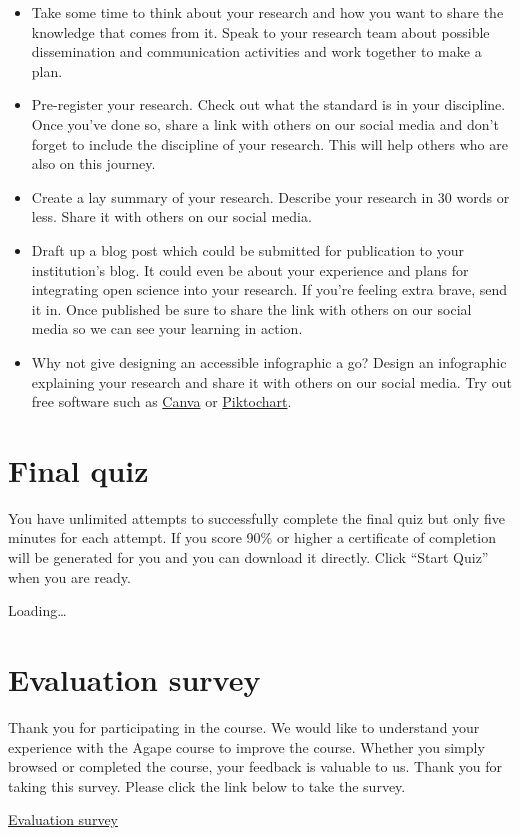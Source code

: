\documentclass[
]{book}
\begin{document}
\begin{itemize}
\item
  Take some time to think about your research and how you want to share the knowledge that comes from it. Speak to your research team about possible dissemination and communication activities and work together to make a plan.
\item
  Pre-register your research. Check out what the standard is in your discipline. Once you've done so, share a link with others on our social media and don't forget to include the discipline of your research. This will help others who are also on this journey.
\item
  Create a lay summary of your research. Describe your research in 30 words or less. Share it with others on our social media.
\item
  Draft up a blog post which could be submitted for publication to your institution's blog. It could even be about your experience and plans for integrating open science into your research. If you're feeling extra brave, send it in. Once published be sure to share the link with others on our social media so we can see your learning in action.
\item
  Why not give designing an accessible infographic a go? Design an infographic explaining your research and share it with others on our social media. Try out free software such as \href{http://www.canva.com/}{Canva} or \href{https://piktochart.com/}{Piktochart}.
\end{itemize}

\hypertarget{final-quiz}{%
\chapter*{Final quiz}\label{final-quiz}}

You have unlimited attempts to successfully complete the final quiz but only five minutes for each attempt. If you score 90\% or higher a certificate of completion will be generated for you and you can download it directly. Click ``Start Quiz'' when you are ready.

Loading\ldots{}

\hypertarget{evaluation-survey}{%
\chapter*{Evaluation survey}\label{evaluation-survey}}

Thank you for participating in the course. We would like to understand your experience with the Agape course to improve the course. Whether you simply browsed or completed the course, your feedback is valuable to us. Thank you for taking this survey. Please click the link below to take the survey.

\href{https://forms.gle/qLPF231TzeGYCwhE6}{Evaluation survey}

  
\end{document}
